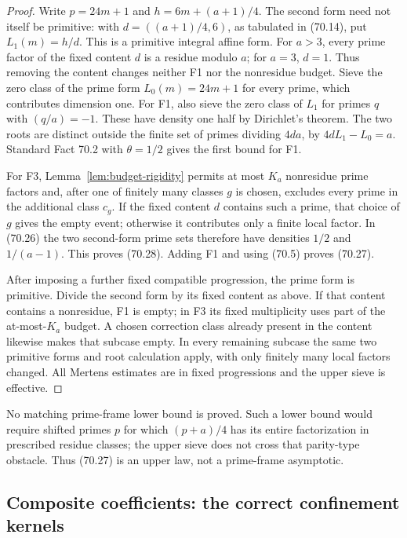\documentclass[10pt,reqno]{amsart}
\theoremstyle{definition}
\newcommand{\1}{\mathbf 1}
\begin{document}
\begin{proof} Write $p=24m+1$ and
$h=6m+(a+1)/4$.  The second form need not itself be primitive: with
$d=((a+1)/4,6)$, as tabulated in (70.14), put
$L_1(m)=h/d$.  This is a primitive integral affine form.  For $a>3$,
every prime factor of the fixed content $d$ is a residue modulo $a$;
for $a=3$, $d=1$.  Thus removing the content changes neither F1 nor
the nonresidue budget.  Sieve the zero class of the prime form
$L_0(m)=24m+1$ for every prime, which contributes dimension one.  For
F1, also sieve the zero class of $L_1$ for primes $q$ with
$(q/a)=-1$.  These have density one half by Dirichlet's theorem.  The two
roots are distinct outside the finite set of primes dividing $4da$, by
$4dL_1-L_0=a$.  Standard Fact 70.2 with $\theta=1/2$ gives the first
bound for F1.

For F3, Lemma~\ref{lem:budget-rigidity} permits at most $K_a$ nonresidue prime factors and,
after one of finitely many classes $g$ is chosen, excludes every prime in
the additional class $c_g$.  If the fixed content $d$ contains such a
prime, that choice of $g$ gives the empty event; otherwise it contributes
only a finite local factor.  In (70.26) the two second-form prime sets
therefore have densities $1/2$ and $1/(a-1)$.  This proves (70.28).
Adding F1 and using (70.5) proves (70.27).

After imposing a further fixed compatible progression, the prime form is
primitive.  Divide the second form by its fixed content as above.  If that
content contains a nonresidue, F1 is empty; in F3 its fixed multiplicity
uses part of the at-most-$K_a$ budget.  A chosen correction class already
present in the content likewise makes that subcase empty.  In every
remaining subcase the same two primitive forms and root calculation apply,
with only finitely many local factors changed.  All Mertens estimates are in
fixed progressions and the upper sieve is effective.
\end{proof}

No matching prime-frame lower bound is proved.  Such a lower bound would
require shifted primes $p$ for which $(p+a)/4$ has its entire
factorization in prescribed residue classes; the upper sieve does not cross
that parity-type obstacle.  Thus (70.27) is an upper law, not a prime-frame
asymptotic.

\subsection{Composite coefficients: the correct confinement kernels}
\end{document}
